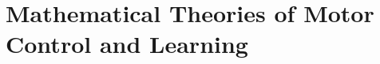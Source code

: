 \documentclass[../main.tex]{subfiles}
\begin{document}





\section{Mathematical Theories of Motor Control and Learning}
  
  
  
\end{document}
